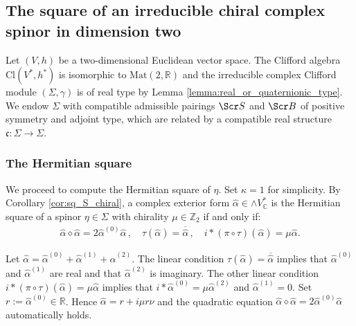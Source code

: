 \documentclass[10pt,a4paper,twoside,reqno]{amsart}
\theoremstyle{plain}
\theoremstyle{definition}
\theoremstyle{remark}
\newcommand{\Mat}{\mathrm{Mat}}
\def\Z{\mathbb{Z}}
\def\C{\mathbb{C}}
\def\R{\mathbb{R}}
\def\scB{\Scr B}
\def\scS{\Scr S}
\def\R{\mathbb{R}}
\begin{document}

\subsection{The square of an irreducible chiral complex spinor in dimension two}


Let $(V,h)$ be a two-dimensional Euclidean vector space. The Clifford algebra $\mathrm{Cl}(V^*,h^*)$ is isomorphic to $\Mat(2,\R)$ and the irreducible complex Clifford module $(\Sigma,\gamma)$ is of real type by Lemma \ref{lemma:real_or_quaternionic_type}. We endow $\Sigma$ with compatible admissible pairings $\scS$ and $\scB$ of positive symmetry and adjoint type, which are related by a compatible real structure $\mathfrak{c}\colon\Sigma\to\Sigma$.


\subsubsection{The Hermitian square}


We proceed to compute the Hermitian square of $\eta$. Set $\kappa=1$ for simplicity. By Corollary \ref{cor:sq_S_chiral}, a complex exterior form $\widehat{\alpha}\in\wedge V^*_\C$ is the Hermitian square of a spinor $\eta\in\Sigma$ with chirality $\mu\in\Z_2$ if and only if: 
\begin{eqnarray*}
\widehat{\alpha} \diamond \widehat{\alpha} = 2\widehat{\alpha}^{(0)} \widehat{\alpha}\, , \quad \tau(\widehat{\alpha}) = \overline{\widehat{\alpha}}\, , \quad i*(\pi\circ\tau)(\widehat{\alpha}) = \mu \widehat{\alpha}.
\end{eqnarray*}

\noindent
Let $\widehat{\alpha} = \widehat{\alpha}^{(0)} + \widehat{\alpha}^{(1)} + \widehat{\alpha}^{(2)}$. The linear condition $\tau(\widehat{\alpha})=\overline{\widehat{\alpha}}$ implies that $\widehat{\alpha}^{(0)}$ and $\widehat{\alpha}^{(1)}$ are real and that $\widehat{\alpha}^{(2)}$ is imaginary. The other linear condition $i*(\pi\circ\tau)(\widehat{\alpha})=\mu\widehat{\alpha}$ implies that $i\ast\widehat{\alpha}^{(0)}=\mu\widehat{\alpha}^{(2)}$ and $\widehat{\alpha}^{(1)}=0$. Set $r:=\widehat{\alpha}^{(0)}\in\R$. Hence $\widehat{\alpha} = r+i\mu r\nu$ and the quadratic equation $\widehat{\alpha}\diamond\widehat{\alpha} = 2\widehat{\alpha}^{(0)} \widehat{\alpha}$ automatically holds.
\end{document}
